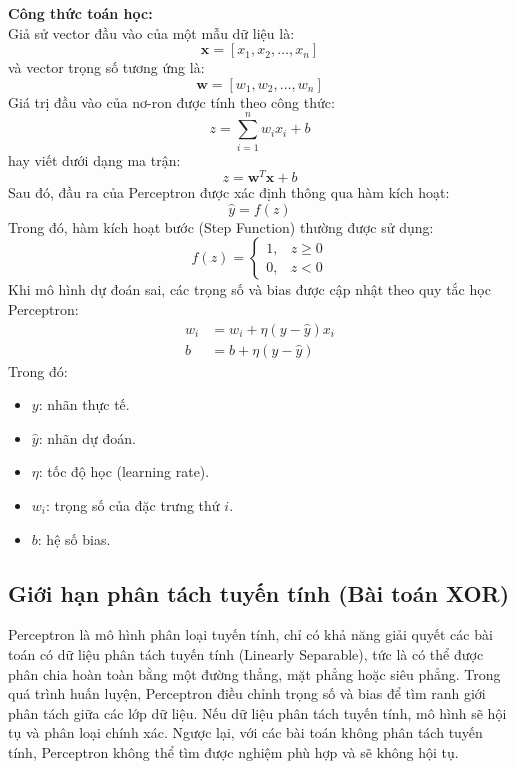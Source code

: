 \documentclass[12pt,a4paper]{report}
\begin{document}
\textbf{Công thức toán học:} \\
Giả sử vector đầu vào của một mẫu dữ liệu là:
\begin{equation}
    \mathbf{x} = [x_1, x_2, \dots, x_n]
\end{equation}
và vector trọng số tương ứng là:
\begin{equation}
    \mathbf{w} = [w_1, w_2, \dots, w_n]
\end{equation}
Giá trị đầu vào của nơ-ron được tính theo công thức:
\begin{equation}
    z = \sum_{i=1}^n w_i x_i + b
\end{equation}
hay viết dưới dạng ma trận:
\begin{equation}
    z = \mathbf{w}^T \mathbf{x} + b
\end{equation}
Sau đó, đầu ra của Perceptron được xác định thông qua hàm kích hoạt:
\begin{equation}
    \hat{y} = f(z)
\end{equation}
Trong đó, hàm kích hoạt bước (Step Function) thường được sử dụng:
\begin{equation}
    f(z) = \begin{cases} 1, & z \ge 0 \\ 0, & z < 0 \end{cases}
\end{equation}
Khi mô hình dự đoán sai, các trọng số và bias được cập nhật theo quy tắc học Perceptron:
\begin{align}
    w_i &= w_i + \eta(y - \hat{y})x_i \\
    b &= b + \eta(y - \hat{y})
\end{align}
Trong đó:
\begin{itemize}
    \item $y$: nhãn thực tế.
    \item $\hat{y}$: nhãn dự đoán.
    \item $\eta$: tốc độ học (learning rate).
    \item $w_i$: trọng số của đặc trưng thứ $i$.
    \item $b$: hệ số bias.
\end{itemize}

\subsection{Giới hạn phân tách tuyến tính (Bài toán XOR)}
Perceptron là mô hình phân loại tuyến tính, chỉ có khả năng giải quyết các bài toán có dữ liệu phân tách tuyến tính (Linearly Separable), tức là có thể được phân chia hoàn toàn bằng một đường thẳng, mặt phẳng hoặc siêu phẳng. Trong quá trình huấn luyện, Perceptron điều chỉnh trọng số và bias để tìm ranh giới phân tách giữa các lớp dữ liệu. Nếu dữ liệu phân tách tuyến tính, mô hình sẽ hội tụ và phân loại chính xác. Ngược lại, với các bài toán không phân tách tuyến tính, Perceptron không thể tìm được nghiệm phù hợp và sẽ không hội tụ.
\end{document}
